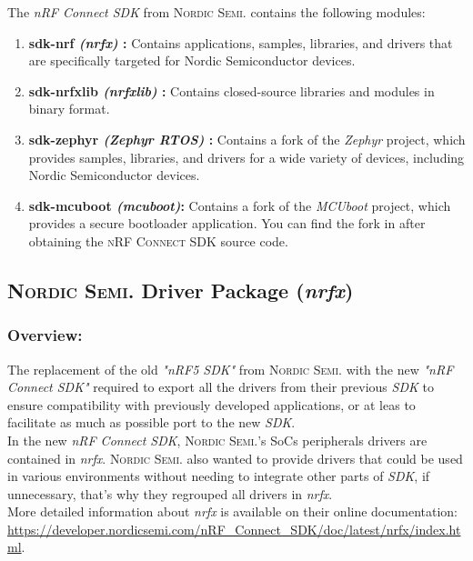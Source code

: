 \documentclass[report.tex]{subfiles}
\begin{document}
\begin{flushleft}
The \textit{nRF Connect SDK} from \textsc{Nordic Semi.} contains the following modules:
\end{flushleft}
\begin{enumerate}
\item \textbf{sdk-nrf \textit{(nrfx)} : }Contains applications, samples, libraries, and drivers that are specifically targeted for Nordic Semiconductor devices.
\item \textbf{sdk-nrfxlib \textit{(nrfxlib)} :} Contains closed-source libraries and modules in binary format.
\item \textbf{sdk-zephyr \textit{(Zephyr RTOS)} :} Contains a fork of the \textit{Zephyr} project, which provides samples, libraries, and drivers for a wide variety of devices, including Nordic Semiconductor devices.
\item \textbf{sdk-mcuboot \textit{(mcuboot)}:} Contains a fork of the \textit{MCUboot} project, which provides a secure bootloader application. You can find the fork in  after obtaining the \textsc{nRF Connect SDK} source code.
\end{enumerate}

\subsection{\textsc{Nordic Semi.} Driver Package (\textit{nrfx})}
\subsubsection{Overview:}
The replacement of the old \textit{"nRF5 SDK"} from \textsc{Nordic Semi.} with the new \textit{"nRF Connect SDK"} required to export all the drivers from their previous \textit{SDK} to ensure compatibility with previously developed applications, or at leas to facilitate as much as possible port to the new \textit{SDK}.\\

In the new \textit{nRF Connect SDK}, \textsc{Nordic Semi.}'s SoCs peripherals drivers are contained in \textit{nrfx}. \textsc{Nordic Semi.} also wanted to provide drivers that could be used in various environments without needing to integrate other parts of \textit{SDK}, if unnecessary, that's why they regrouped all drivers in \textit{nrfx}. \\

More detailed information about \textit{nrfx} is available on their online documentation: \url{https://developer.nordicsemi.com/nRF_Connect_SDK/doc/latest/nrfx/index.html}.
\end{document}
